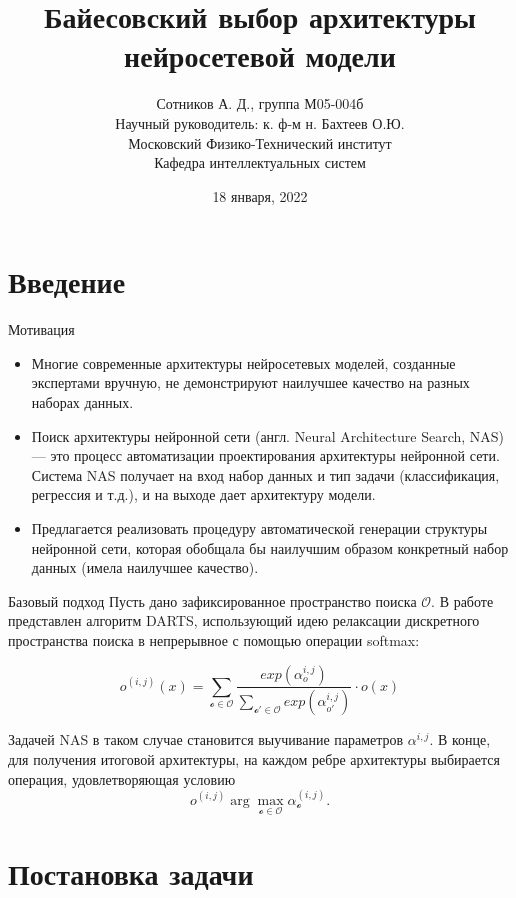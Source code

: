 \documentclass[9pt]{beamer}
\title{
	Байесовский выбор архитектуры нейросетевой модели}
\author{\small{%
		Сотников А. Д., группа М05-004б}\\
	Научный руководитель: к. ф-м н. Бахтеев О.Ю.\\
	\vspace{30pt}%
	Московский Физико-Технический институт%
	\\
	Кафедра интеллектуальных систем
	\vspace{20pt}%
}
\date{\small{18 января, 2022}}
\begin{document}
	
	\maketitle
	
	
	\section{Введение}
	
	\begin{frame}{Мотивация}
		\begin{itemize}
			\item Многие современные архитектуры нейросетевых моделей, созданные экспертами  вручную, не демонстрируют наилучшее качество на разных наборах данных.
			\item Поиск архитектуры нейронной сети (англ. Neural Architecture Search, NAS) — это процесс автоматизации проектирования архитектуры нейронной сети. Система NAS получает на вход набор данных и тип задачи (классификация, регрессия и т.д.), и на выходе дает архитектуру модели.
			\item Предлагается реализовать процедуру автоматической генерации структуры нейронной сети, которая обобщала бы наилучшим образом конкретный набор данных (имела наилучшее качество).
		\end{itemize}
	\end{frame}
	
	\begin{frame}{Базовый подход}
		Пусть дано зафиксированное пространство поиска $\mathcal{O}$. В работе \cite{DBLP:journals/corr/abs-1806-09055} представлен алгоритм DARTS, использующий идею релаксации дискретного пространства поиска в непрерывное с помощью операции softmax:
		
		$$o^{(i, j)}(x) = \sum_{\mathcal{o}\in\mathcal{O}}\frac{exp(\alpha_{o}^{i, j})}{\sum_{\mathcal{o\prime}\in\mathcal{O}}{exp(\alpha_{o\prime}^{i, j})}}\cdot o(x)$$
		
		Задачей NAS в таком случае становится выучивание параметров $\alpha^{i, j}$. В конце, для получения итоговой архитектуры, на каждом ребре архитектуры выбирается операция, удовлетворяющая условию 
		$$o^{(i, j)}\arg \max_{\mathcal{o}\in\mathcal{O}} \alpha_{\mathcal{o}}^{(i, j)}.$$
	\end{frame}
	
	\section{Постановка задачи}
	
\end{document}
